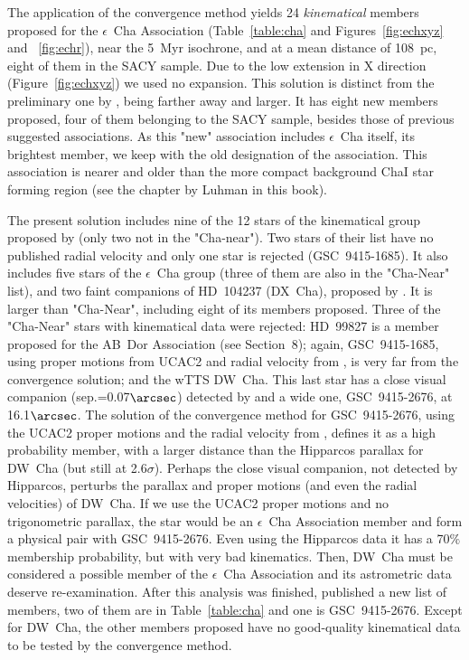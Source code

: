 \documentclass[11pt,twoside]{book}
\begin{document}
The application of the convergence method yields 24 {\it kinematical} members proposed for
the $\epsilon$~Cha Association (Table~\ref{table:cha} and
Figures~\ref{fig:echxyz} and ~\ref{fig:echr}), near the 5~Myr isochrone,
and at a mean distance of 108~pc, eight of them in the SACY sample.
Due to the low extension in X direction (Figure~\ref{fig:echxyz}) we used no expansion.
This solution is distinct from the preliminary one by  \citet{torres03a, torres03},
being farther away and larger.
It has eight new members proposed, four of them belonging to the SACY sample, besides
those of previous suggested associations.
As this "new"  association  includes  $\epsilon$~Cha itself, its brightest member,
we keep with the old designation of the association.
This association is nearer and older than the more compact background
ChaI star forming region (see the chapter by Luhman in this book).



The present solution includes nine of the 12 stars of the kinematical
group proposed by \citet{terranegra99} (only two not in the
"Cha-near").  Two stars of their list have no published radial
velocity and only one star is rejected (GSC~9415-1685).  It also
includes five stars of the $\epsilon$~Cha group \citep{mamajek00}
(three of them are also in the "Cha-Near" list), and two faint
companions of HD~104237 (DX~Cha), proposed by \citet{feige03}.  It is
larger than "Cha-Near", including eight of its members proposed.
Three of the "Cha-Near" stars with kinematical data were rejected:
HD~99827 is a member proposed for the AB~Dor Association (see
Section~8); again, GSC~9415-1685, using proper motions from UCAC2 and
radial velocity from \citet{guenther07}, is very far from the
convergence solution; and the wTTS DW~Cha.  This last star has a close
visual companion (sep.=0.07$\arcsec$) detected by \citet{koler01} and
a wide one, GSC~9415-2676, at 16.1$\arcsec$.  The solution of the
convergence method for GSC~9415-2676, using the UCAC2 proper motions
and the radial velocity from \citet{covino97}, defines it as a high
probability member, with a larger distance than the Hipparcos parallax
for DW~Cha (but still at 2.6$\sigma$).  Perhaps the close visual
companion, not detected by Hipparcos, perturbs the parallax and proper
motions (and even the radial velocities) of DW~Cha.  If we use the
UCAC2 proper motions and no trigonometric parallax, the star would be
an $\epsilon$~Cha Association member and form a physical pair with
GSC~9415-2676.  Even using the Hipparcos data it has a 70$\%$
membership probability, but with very bad kinematics.  Then, DW~Cha
must be considered a possible member of the $\epsilon$~Cha Association
and its astrometric data deserve re-examination.  After this analysis
was finished, \citet{luhman08} published a new list of members, two of
them are in Table~\ref{table:cha} and one is GSC~9415-2676.  Except
for DW~Cha, the other members proposed have no good-quality
kinematical data to be tested by the convergence method.
\end{document}
